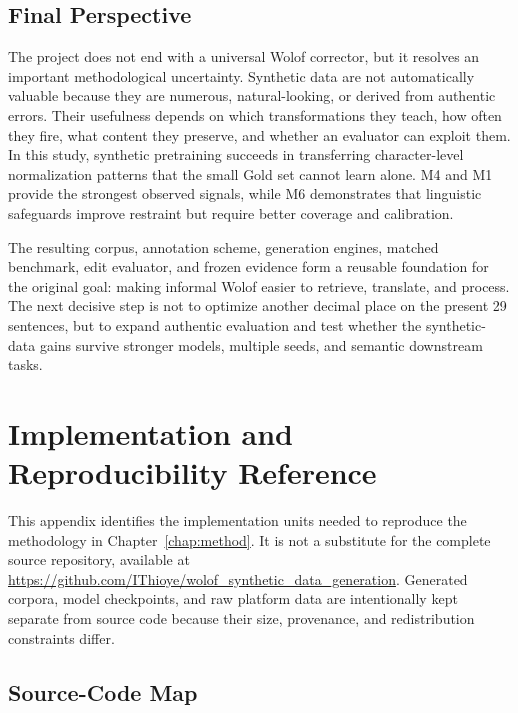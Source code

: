 \documentclass[12pt, a4paper, twoside, openany]{report}
\begin{document}
\section{Final Perspective}

The project does not end with a universal Wolof corrector, but it resolves an important methodological uncertainty. Synthetic data are not automatically valuable because they are numerous, natural-looking, or derived from authentic errors. Their usefulness depends on which transformations they teach, how often they fire, what content they preserve, and whether an evaluator can exploit them. In this study, synthetic pretraining succeeds in transferring character-level normalization patterns that the small Gold set cannot learn alone. M4 and M1 provide the strongest observed signals, while M6 demonstrates that linguistic safeguards improve restraint but require better coverage and calibration.

The resulting corpus, annotation scheme, generation engines, matched benchmark, edit evaluator, and frozen evidence form a reusable foundation for the original goal: making informal Wolof easier to retrieve, translate, and process. The next decisive step is not to optimize another decimal place on the present 29 sentences, but to expand authentic evaluation and test whether the synthetic-data gains survive stronger models, multiple seeds, and semantic downstream tasks.


\printbibliography[
  heading = bibintoc,
  title   = {Bibliography},
]

\appendix
\chapter{Implementation and Reproducibility Reference}
\label{app:code}

This appendix identifies the implementation units needed to reproduce the methodology in Chapter~\ref{chap:method}. It is not a substitute for the complete source repository, available at \url{https://github.com/IThioye/wolof_synthetic_data_generation}. Generated corpora, model checkpoints, and raw platform data are intentionally kept separate from source code because their size, provenance, and redistribution constraints differ.

\section{Source-Code Map}
\end{document}
